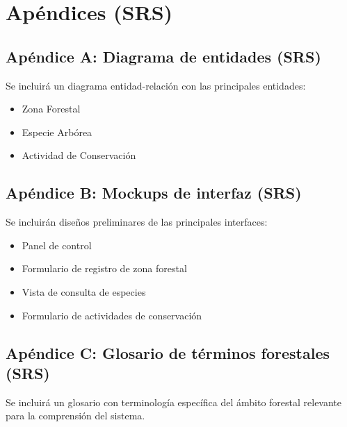 \section{Apéndices (SRS)}
\label{srs:apendices}

\subsection{Apéndice A: Diagrama de entidades (SRS)}
Se incluirá un diagrama entidad-relación con las principales entidades:
\begin{itemize}
\item Zona Forestal
\item Especie Arbórea
\item Actividad de Conservación
\end{itemize}

\subsection{Apéndice B: Mockups de interfaz (SRS)}
Se incluirán diseños preliminares de las principales interfaces:
\begin{itemize}
\item Panel de control
\item Formulario de registro de zona forestal
\item Vista de consulta de especies
\item Formulario de actividades de conservación
\end{itemize}

\subsection{Apéndice C: Glosario de términos forestales (SRS)}
Se incluirá un glosario con terminología específica del ámbito forestal relevante para la comprensión del sistema.
